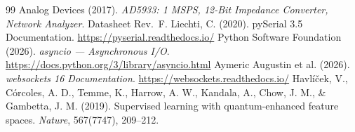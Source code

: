 \documentclass[11pt,a4paper,spanish]{book}
\begin{document}
\begin{thebibliography}{99}
	 Analog Devices (2017). \emph{AD5933: 1 MSPS, 12-Bit Impedance Converter, Network Analyzer}. Datasheet Rev.~F.
	 Liechti, C. (2020). pySerial 3.5 Documentation. \url{https://pyserial.readthedocs.io/}
	 Python Software Foundation (2026). \emph{asyncio --- Asynchronous I/O}. \url{https://docs.python.org/3/library/asyncio.html}
	 Aymeric Augustin et al. (2026). \emph{websockets 16 Documentation}. \url{https://websockets.readthedocs.io/}
	 Havl\'{i}\v{c}ek, V., C\'{o}rcoles, A. D., Temme, K., Harrow, A. W., Kandala, A., Chow, J. M., \& Gambetta, J. M. (2019). Supervised learning with quantum-enhanced feature spaces. \emph{Nature}, 567(7747), 209--212.
\end{thebibliography}
\end{document}
